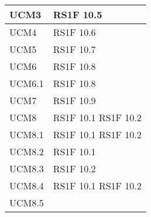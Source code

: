 \begin{center}
\begin{longtable}{ | p{5cm} | p{5cm} |}
            UCM3 &  RS1F 10.5 \newline  \\ \hline      
            UCM4 &  RS1F 10.6 \newline  \\ \hline      
            UCM5 &  RS1F 10.7 \newline  \\ \hline      
            UCM6 &  RS1F 10.8 \newline  \\ \hline      
            UCM6.1 &  RS1F 10.8 \newline  \\ \hline      
            UCM7 &  RS1F 10.9 \newline  \\ \hline      
            UCM8 &  RS1F 10.1 \newline  RS1F 10.2 \newline  \\ \hline      
            UCM8.1 &  RS1F 10.1 \newline  RS1F 10.2 \newline  \\ \hline      
            UCM8.2 &  RS1F 10.1 \newline  \\ \hline      
            UCM8.3 &  RS1F 10.2 \newline  \\ \hline      
            UCM8.4 &  RS1F 10.1 \newline  RS1F 10.2 \newline  \\ \hline      
            UCM8.5 &  \\ \hline     
      \end{longtable}
      \egroup
      \end{center}  
\clearpage

